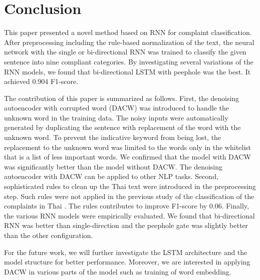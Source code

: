 \setlength{\parindent}{0.5cm}
\section{Conclusion}
This paper presented a novel method based on RNN for complaint classification.
After preprocessing including the rule-based normalization of the text, 
the neural network with the single or bi-directional RNN was trained to classify
the given sentence into nine compliant categories. 
By investigating several variations of the RNN models, 
we found that bi-directional LSTM with peephole was the best.
It achieved 0.904 F1-score.


The contribution of this paper is summarized as follows.
First, the denoising autoencoder with corrupted word (DACW) was
introduced to handle the unknown word in the training data.
The noisy inputs were automatically generated by duplicating
the sentence with replacement of the word with the unknown word.
To prevent the indicative keyword from being lost,
the replacement to the unknown word was limited to the words
only in the whitelist that is a list of less important words.
We confirmed that the model with DACW was significantly better
than the model without DACW. 
The denoising autoencoder with DACW can be applied to other NLP tasks. 
Second, sophisticated rules to clean up the Thai text were introduced
in the preprocessing step. Such rules were not applied in the previous study of the 
classification of the complaints in Thai \cite{assawinjaipetch-etal-2016-recurrent}.
The rules contributes to improve F1-score by 0.06.
Finally, the various RNN models were empirically evaluated.
We found that bi-directional RNN was better than single-direction
and the peephole gate was slightly better than the other configuration.


For the future work, we will further investigate
the LSTM architecture and the model structure for better performance.
Moreover, we are interested in applying DACW in various parts of the model
such as training of word embedding.

